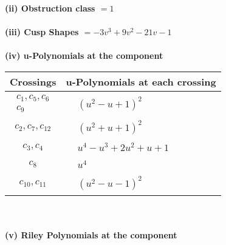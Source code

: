 \documentclass[1p]{elsarticle_modified}
\theoremstyle{definition}
\begin{document}
\flushleft \textbf{(ii) Obstruction class $= 1$}\\~\\
\flushleft \textbf{(iii) Cusp Shapes $= -3 v^3+9 v^2-21 v-1$}\\~\\
\newpage\renewcommand{\arraystretch}{1}
\flushleft \textbf{(iv) u-Polynomials at the component}\newline \\
\begin{tabular}{m{50pt}|m{274pt}}
Crossings & \hspace{64pt}u-Polynomials at each crossing \\
\hline $$\begin{aligned}c_{1},c_{5},c_{6}\\c_{9}\end{aligned}$$&$\begin{aligned}
&(u^2- u+1)^2
\end{aligned}$\\
\hline $$\begin{aligned}c_{2},c_{7},c_{12}\end{aligned}$$&$\begin{aligned}
&(u^2+u+1)^2
\end{aligned}$\\
\hline $$\begin{aligned}c_{3},c_{4}\end{aligned}$$&$\begin{aligned}
&u^4- u^3+2 u^2+u+1
\end{aligned}$\\
\hline $$\begin{aligned}c_{8}\end{aligned}$$&$\begin{aligned}
&u^4
\end{aligned}$\\
\hline $$\begin{aligned}c_{10},c_{11}\end{aligned}$$&$\begin{aligned}
&(u^2- u-1)^2
\end{aligned}$\\
\hline
\end{tabular}\\~\\
\newpage\renewcommand{\arraystretch}{1}
\flushleft \textbf{(v) Riley Polynomials at the component}\newline \\
\end{document}
